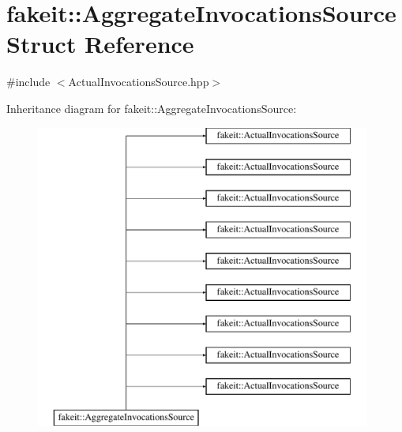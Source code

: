 \hypertarget{structfakeit_1_1AggregateInvocationsSource}{}\section{fakeit\+::Aggregate\+Invocations\+Source Struct Reference}
\label{structfakeit_1_1AggregateInvocationsSource}


{\ttfamily \#include $<$Actual\+Invocations\+Source.\+hpp$>$}

Inheritance diagram for fakeit\+::Aggregate\+Invocations\+Source\+:\begin{figure}[H]
\begin{center}
\leavevmode
\includegraphics[height=10.000000cm]{structfakeit_1_1AggregateInvocationsSource}
\end{center}
\end{figure}

